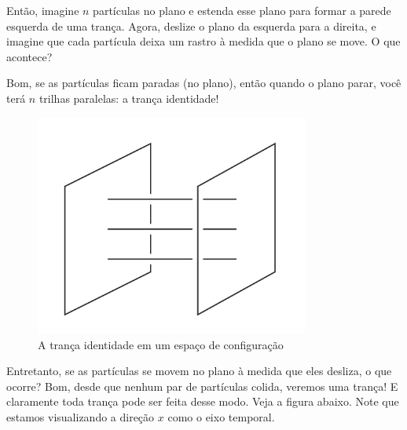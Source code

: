 	\par\vspace{0.3cm} Então, imagine $n$ partículas no plano e estenda esse plano para formar 
	a parede esquerda de uma trança. Agora, deslize o plano da esquerda para a direita, e imagine 
	que cada partícula deixa um rastro à medida que o plano se move. O que acontece?
	
	\par\vspace{0.3cm} Bom, se as partículas ficam paradas (no plano), então quando o plano parar, 
	você terá $n$ trilhas paralelas: a trança identidade!
	\begin{figure}[H]
		\begin{center} 
			\includegraphics[width=9cm]{Images/tranca_identidade_conf.png}
		\end{center}\caption{A trança identidade em um espaço de configuração}\label{tranca identidade espaco configuracao}
	\end{figure}
	Entretanto, se as partículas se movem no plano à medida que eles desliza, o que ocorre? 
	Bom, desde que nenhum par de partículas colida, veremos uma trança! E claramente toda trança 
	pode ser feita desse modo. Veja a figura abaixo. Note que estamos visualizando a direção 
	$x$ como o eixo temporal.
	
